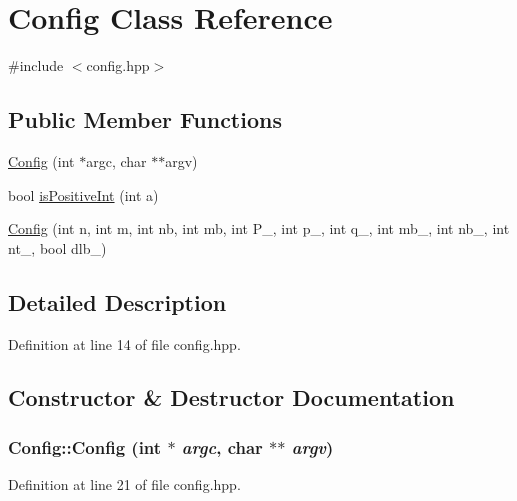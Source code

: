 \hypertarget{class_config}{
\section{Config Class Reference}
\label{class_config}
}


{\ttfamily \#include $<$config.hpp$>$}\subsection*{Public Member Functions}
\begin{DoxyCompactItemize}
\item 
\hyperlink{class_config_aec74fc6881404a82143ef28fcebf3cb2}{Config} (int $\ast$argc, char $\ast$$\ast$argv)
\item 
bool \hyperlink{class_config_a06b19f6b051be4b77ea61ee3ebd365d2}{isPositiveInt} (int a)
\item 
\hyperlink{class_config_aae27971e1a25c43a395738b7742afebb}{Config} (int n, int m, int nb, int mb, int P\_\-, int p\_\-, int q\_\-, int mb\_\-, int nb\_\-, int nt\_\-, bool dlb\_\-)
\end{DoxyCompactItemize}


\subsection{Detailed Description}


Definition at line 14 of file config.hpp.

\subsection{Constructor \& Destructor Documentation}
\hypertarget{class_config_aec74fc6881404a82143ef28fcebf3cb2}{
\subsubsection[{Config}]{\setlength{\rightskip}{0pt plus 5cm}Config::Config (int $\ast$ {\em argc}, \/  char $\ast$$\ast$ {\em argv})}}
\label{class_config_aec74fc6881404a82143ef28fcebf3cb2}


Definition at line 21 of file config.hpp.

